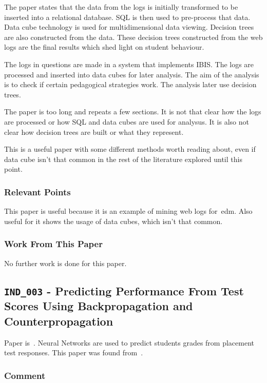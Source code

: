 The paper states that the data from the logs is initially transformed to be
inserted into a relational database. SQL is then used to pre-process that data.
Data cube technology is used for multidimensional data viewing. Decision trees
are also constructed from the data. These decision trees constructed from the
web logs are the final results which shed light on student behaviour.

The logs in questions are made in a system that implements IBIS. The logs are
processed and inserted into data cubes for later analysis. The aim of the
analysis is to check if certain pedagogical strategies work. The analysis later
use decision trees.

The paper is too long and repeats a few sections. It is not that clear how the
logs are processed or how SQL and data cubes are used for analysus. It is also
not clear how decision trees are built or what they represent.

This is a useful paper with some different methods worth reading about, even if
data cube isn't that common in the rest of the literature explored until this
point.

\subsubsection{Relevant Points}

This paper is useful because it is an example of mining web logs for~\gls{edm}.
Also useful for it shows the usage of data cubes, which isn't that common.

\subsubsection{Work From This Paper}

No further work is done for this paper.

\subsection{\texttt{IND\_003} - Predicting Performance From Test Scores Using
Backpropagation and Counterpropagation}

Paper is~\cite{ind_003}. Neural Networks are used to predict students grades
from placement test responses. This paper was found from~\cite{ind_001}.

\subsubsection{Comment}

